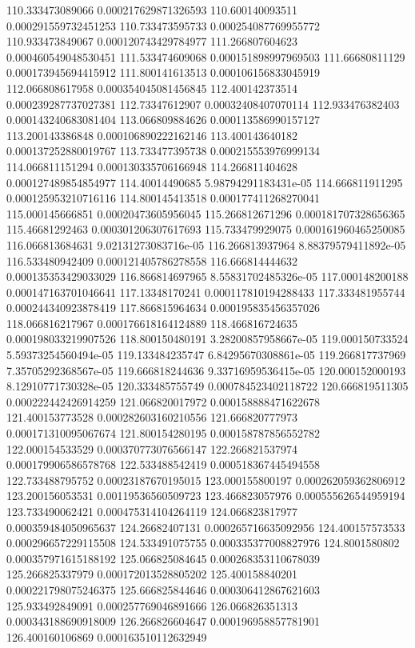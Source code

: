 {110.333473089066 0.000217629871326593
110.600140093511 0.000291559732451253
110.733473595733 0.000254087769955772
110.933473849067 0.000120743429784977
111.266807604623 0.000460549048530451
111.533474609068 0.000151898997969503
111.66680811129 0.000173945694415912
111.800141613513 0.000106156833045919
112.066808617958 0.000354045081456845
112.400142373514 0.000239287737027381
112.73347612907 0.00032408407070114
112.933476382403 0.000143240683081404
113.066809884626 0.000113586990157127
113.200143386848 0.000106890222162146
113.400143640182 0.000137252880019767
113.733477395738 0.000215553976999134
114.066811151294 0.000130335706166948
114.266811404628 0.000127489854854977
114.40014490685 5.98794291183431e-05
114.666811911295 0.000125953210716116
114.800145413518 0.000177411268270041
115.000145666851 0.00020473605956045
115.266812671296 0.000181707328656365
115.46681292463 0.000301206307617693
115.733479929075 0.000161960465250085
116.066813684631 9.02131273083716e-05
116.266813937964 8.88379579411892e-05
116.533480942409 0.000121405786278558
116.666814444632 0.000135353429033029
116.866814697965 8.55831702485326e-05
117.000148200188 0.000147163701046641
117.13348170241 0.000117810194288433
117.333481955744 0.000244340923878419
117.866815964634 0.000195835456357026
118.066816217967 0.000176618164124889
118.466816724635 0.000198033219907526
118.800150480191 3.28200857958667e-05
119.000150733524 5.59373254560494e-05
119.133484235747 6.84295670308861e-05
119.266817737969 7.35705292368567e-05
119.666818244636 9.33716959536415e-05
120.000152000193 8.12910771730328e-05
120.333485755749 0.000784523402118722
120.666819511305 0.000222442426914259
121.066820017972 0.000158888471622678
121.400153773528 0.000282603160210556
121.666820777973 0.000171310095067674
121.800154280195 0.000158787856552782
122.000154533529 0.000370773076566147
122.266821537974 0.000179906586578768
122.533488542419 0.000518367445494558
122.733488795752 0.00023187670195015
123.000155800197 0.000262059362806912
123.200156053531 0.00119536560509723
123.466823057976 0.000555626544959194
123.733490062421 0.000475314104264119
124.066823817977 0.000359484050965637
124.26682407131 0.000265716635092956
124.400157573533 0.000296657229115508
124.533491075755 0.000335377008827976
124.8001580802 0.000357971615188192
125.066825084645 0.000268353110678039
125.266825337979 0.000172013528805202
125.400158840201 0.000221798075246375
125.666825844646 0.000306412867621603
125.933492849091 0.000257769046891666
126.066826351313 0.000343188690918009
126.266826604647 0.000196958857781901
126.400160106869 0.000163510112632949
}
